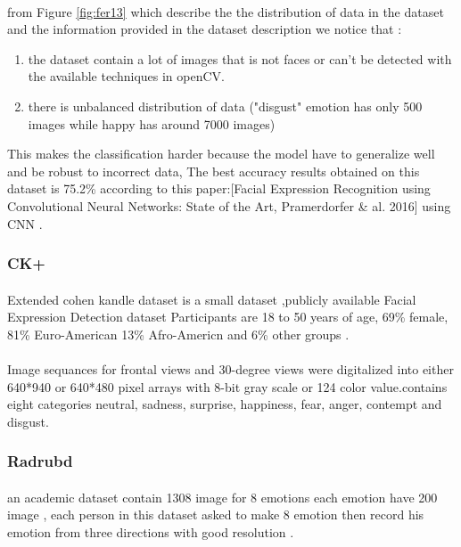 \paragraph{}
from Figure \ref{fig:fer13} which describe the the distribution of data in the dataset and the information provided in the dataset description we notice that :
\begin{enumerate}
	\item the dataset contain a lot of images that is not faces or can't be detected with the available techniques in openCV.
	\item there is unbalanced distribution of data ("disgust" emotion has only 500 images while happy has around 7000 images)   
\end{enumerate}

 This makes the classification harder because the model have to generalize well and be robust to incorrect data, The best accuracy results obtained on this dataset is 75.2\% according to this paper:\cite{state_of_art}[Facial Expression Recognition using Convolutional Neural Networks: State of the Art, Pramerdorfer \& al. 2016] using CNN .

\subsubsection{CK+}
\paragraph{}
Extended cohen kandle dataset is a small dataset ,publicly available Facial Expression Detection dataset Participants are 18 to 50 years of age, 69\% female, 81\% Euro-American 
13\% Afro-Americn and 6\% other groups .
\paragraph{}
Image sequances for frontal views and 30-degree views were digitalized into either 640*940 or 640*480 pixel arrays with 8-bit gray scale or 124 color value.contains eight categories neutral, sadness, surprise, happiness, fear, anger, contempt and disgust.

\subsubsection{Radrubd}
\paragraph{}
an academic dataset contain 1308 image for 8 emotions each emotion have 200 image , each person in this dataset asked to make 8 emotion then record his emotion from three directions with good resolution .
